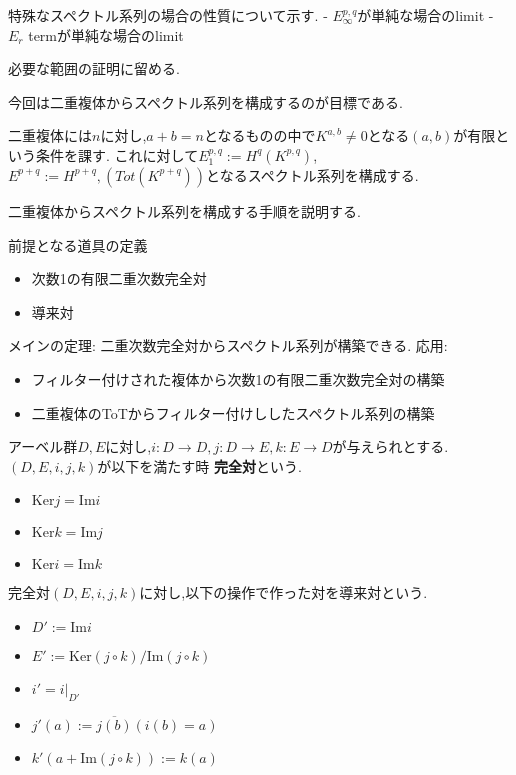 特殊なスペクトル系列の場合の性質について示す.
- $E_{\infty}^{p,q}$が単純な場合のlimit
- $E_r$ termが単純な場合のlimit

必要な範囲の証明に留める.

今回は二重複体からスペクトル系列を構成するのが目標である.

二重複体には$n$に対し,$a+b=n$となるものの中で$K^{a,b}\neq 0$となる$(a,b)$が有限という条件を課す.
これに対して$E_1^{p,q}:= H^q(K^{p,q})$,$E^{p+q}:=H^{p+q},(Tot(K^{p+q}))$となるスペクトル系列を構成する.

二重複体からスペクトル系列を構成する手順を説明する.

前提となる道具の定義
\begin{itemize}
  \item 次数1の有限二重次数完全対
  \item 導来対
\end{itemize}
メインの定理: 二重次数完全対からスペクトル系列が構築できる.
応用:
\begin{itemize}
  \item フィルター付けされた複体から次数1の有限二重次数完全対の構築
  \item 二重複体のToTからフィルター付けししたスペクトル系列の構築
\end{itemize}

\begin{dfn}
アーベル群$D,E$に対し,$i:D \to D,j:D \to E, k:E \to D$が与えられとする.
$(D,E,i,j,k)$が以下を満たす時 \textbf{完全対}という.
\begin{itemize}
  \item $\mathrm{Ker}j = \mathrm{Im}i$
  \item $\mathrm{Ker}k = \mathrm{Im}j$
  \item $\mathrm{Ker}i = \mathrm{Im}k$
\end{itemize}
\end{dfn}

\begin{dfn}
完全対$(D,E,i,j,k)$に対し,以下の操作で作った対を導来対という.
\begin{itemize}
    \item $D':=\mathrm{Im}i$
    \item $E':=\mathrm{Ker}(j \circ k)/ \mathrm{Im}(j \circ k)$
    \item $i'=i|_{D'}$
    \item $j'(a):= \overline{j(b)}(i(b)=a)$
    \item $k'(a + \mathrm{Im}(j \circ k )):= k(a)$
\end{itemize}
\end{dfn}

